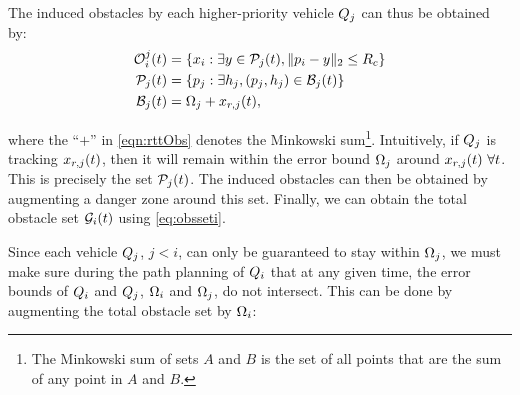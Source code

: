 %

The induced obstacles by each higher-priority vehicle $Q_j$ can thus be obtained by: 
\begin{equation} 
\label{eqn:rttObs}
\begin{aligned}
\ioset_i^j(t) &=  \{\state_i: \exists y \in \pfrs_j(t), \|\pos_i - y\|_2 \le \rc \} \\
\pfrs_j(t) &= \{\pos_j: \exists \npos_j, (\pos_j, \npos_j) \in \boset_j(t)\} \\
\boset_j(t) &= \disckernel_j  + \state_{r,j}(t),
\end{aligned}
\end{equation}

\noindent where the ``$+$'' in \eqref{eqn:rttObs} denotes the Minkowski sum\footnote{The Minkowski sum of sets $A$ and $B$ is the set of all points that are the sum of any point in $A$ and $B$.}. Intuitively, if $Q_j$ is tracking $x_{r,j}(t)$, then it will remain within the error bound $\Omega_j$ around $x_{r,j}(t) ~\forall t$. This is precisely the set $\mathcal{P}_j(t)$. The induced obstacles can then be obtained by augmenting a danger zone around this set. Finally, we can obtain the total obstacle set $\mathcal{G}_i(t)$ using \eqref{eq:obsseti}. 

Since each vehicle $Q_j$, $j<i$, can only be guaranteed to stay within $\Omega_j$, we must make sure during the path planning of $Q_i$ that at any given time, the error bounds of $Q_i$ and $Q_j$, $\Omega_i$ and $\Omega_j$, do not intersect. This can be done by augmenting the total obstacle set by $\Omega_i$:%

